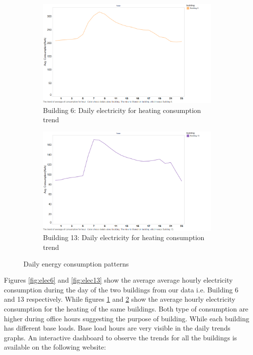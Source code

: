 \begin{figure}[h]
        \begin{subfigure}[b]{0.45\textwidth}
                \includegraphics[width=\textwidth]{images/b6_daily_heat.png}
                \caption{Building 6: Daily electricity for heating consumption trend}
                \label{fig:heat6}
        \end{subfigure}
        \begin{subfigure}[b]{0.45\textwidth}
                        \includegraphics[width=\textwidth]{images/b13_daily_heat.png}
                        \caption{Building 13: Daily electricity for heating consumption trend}
                        \label{fig:heat13}
       \end{subfigure}
     \caption{Daily energy consumption patterns}\label{fig:animals}
\end{figure}

Figures \ref{fig:elec6} and \ref{fig:elec13} show the average average hourly electricity consumption during the day of the two buildings from our data i.e. Building 6 and 13 respectively. While  figures \ref{fig:heat6} and \ref{fig:heat13} show the average hourly electricity consumption for the heating of the same buildings. Both type of consumption are higher during office hours suggesting the purpose of building.  While each building has different base loads. Base load hours are very visible in the daily trends graphs. An interactive dashboard to observe the trends for all the buildings is available on the following website:

